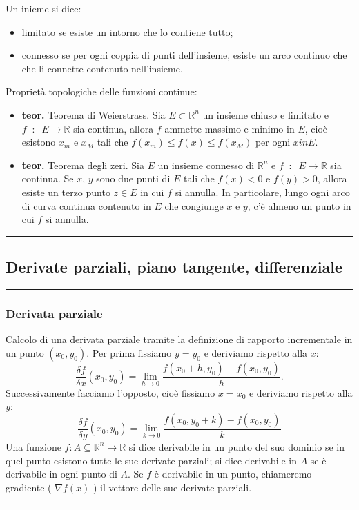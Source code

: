 Un inieme si dice:
\begin{itemize}
    \item limitato se esiste un intorno che lo contiene tutto;
    \item connesso se per ogni coppia di punti dell'insieme, esiste un arco continuo che che li connette contenuto nell'insieme.
\end{itemize}
Proprietà topologiche delle funzioni continue:
\begin{itemize}
    \item \textbf{teor.} Teorema di Weierstrass. Sia $E \subset \mathbb{R}^n$ un insieme chiuso e limitato e $f \;\;:\;\; E \rightarrow \mathbb{R}$ sia continua, allora $f$ ammette massimo e minimo in $E$, cioè esistono $x_m$ e $x_M$ tali che $f(x_m) \leq f(x) \leq f(x_M)$ per ogni $x in E$.
    \item \textbf{teor.} Teorema degli zeri. Sia $E$ un insieme connesso di $\mathbb{R}^n$ e $f \;\;:\;\; E \rightarrow \mathbb{R}$ sia continua. Se $x$, $y$ sono due punti di $E$ tali che $ f(x) < 0$ e $f(y) > 0$, allora esiste un terzo punto $z \in E$ in cui $f$ si annulla. In particolare, lungo ogni arco di curva continua contenuto in $E$ che congiunge $x$ e $y$, c'è almeno un punto in cui $f$ si annulla.
\end{itemize}
\rule{\textwidth}{2pt}
\subsection*{Derivate parziali, piano tangente, differenziale}
\rule{\textwidth}{0.4pt}
\subsubsection*{Derivata parziale}
Calcolo di una derivata parziale tramite la definizione di rapporto incrementale in un punto $(x_0, y_0)$. \newline
Per prima fissiamo $y=y_0$ e deriviamo rispetto alla $x$:
\[
    \frac{\delta f}{\delta x} (x_0,y_0) = \lim_{h\rightarrow 0}\frac{f(x_0+h, y_0)- f(x_0,y_0)}{h}.
\]
Successivamente facciamo l'opposto, cioè fissiamo $x=x_0$ e deriviamo rispetto alla $y$:
\[
    \frac{\delta f}{\delta y} (x_0,y_0) = \lim_{k\rightarrow 0}\frac{f(x_0, y_0+k)- f(x_0,y_0)}{k}
\]
Una funzione $f: A \subseteq \mathbb{R}^n \rightarrow  \mathbb{R}$ si dice derivabile in un punto del suo dominio se in quel punto esistono tutte le sue derivate parziali; si dice derivabile in $A$ se è derivabile in ogni punto di $A$.\newline
Se $f$ è derivabile in un punto, chiameremo gradiente ( $\nabla f(x)$ ) il vettore delle sue derivate parziali.\newline
\rule{\textwidth}{0.4pt}
